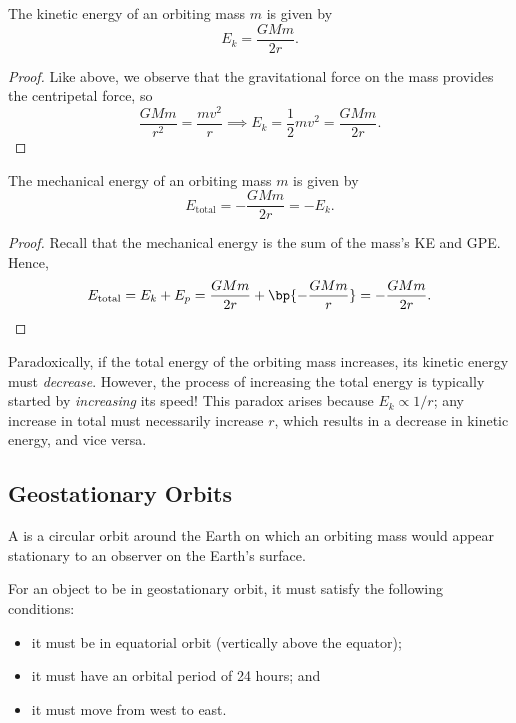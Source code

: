 \begin{proposition}
    The kinetic energy of an orbiting mass $m$ is given by \[E_k = \frac{GMm}{2r}.\]
\end{proposition}
\begin{proof}
    Like above, we observe that the gravitational force on the mass provides the centripetal force, so \[\frac{GMm}{r^2} = \frac{mv^2}{r} \implies E_k = \frac12 mv^2 = \frac{GMm}{2r}.\]
\end{proof}

\begin{corollary}
    The mechanical energy of an orbiting mass $m$ is given by \[E_{\text{total}} = -\frac{GMm}{2r} = -E_k.\]
\end{corollary}
\begin{proof}
    Recall that the mechanical energy is the sum of the mass's KE and GPE. Hence, \[E_{\text{total}} = E_k + E_p = \frac{GMm}{2r} + \bp{- \frac{GMm}{r}} = -\frac{GMm}{2r}.\]
\end{proof}

Paradoxically, if the total energy of the orbiting mass increases, its kinetic energy must \emph{decrease}. However, the process of increasing the total energy is typically started by \emph{increasing} its speed! This paradox arises because $E_k \propto 1/r$; any increase in total must necessarily increase $r$, which results in a decrease in kinetic energy, and vice versa.

\subsection{Geostationary Orbits}

\begin{definition}
    A  is a circular orbit around the Earth on which an orbiting mass would appear stationary to an observer on the Earth's surface.
\end{definition}

For an object to be in geostationary orbit, it must satisfy the following conditions:
\begin{itemize}
    \item it must be in equatorial orbit (vertically above the equator);
    \item it must have an orbital period of 24 hours; and
    \item it must move from west to east.
\end{itemize}